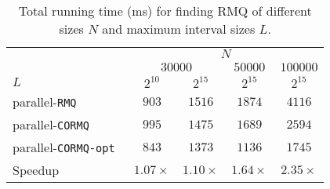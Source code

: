 \begin{table}[!thb]
  \caption{Total running time (ms) for finding RMQ of different sizes $N$ and maximum interval sizes $L$.}
  \label{tlb:CORMQ}
  \begin{minipage}{\columnwidth}
  \begin{center}
  \begin{tabular}{l c c c c}
    \toprule
      & \multicolumn{4}{c}{$N$} \\
      \cline{2-5}
        & \multicolumn{2}{c}{$30000$} & $50000$ & $100000$ \\
      $L$ & $2^{10}$ & $2^{15}$ & $2^{15}$ & $2^{15}$ \\
      \hline
      parallel-\tt{RMQ}     & $903$ & $1516$ & $1874$ & $4116$ \\
      parallel-\tt{CORMQ}   & $995$ & $1475$ & $1689$ & $2594$ \\
      parallel-\tt{CORMQ-opt} & $843$ & $1373$ & $1136$ & $1745$ \\
      \hline
      Speedup & $1.07\times$ & $1.10\times$ & $1.64\times$ & $2.35\times$\\
    \bottomrule
  \end{tabular}
  \end{center}
  \end{minipage}
\end{table}